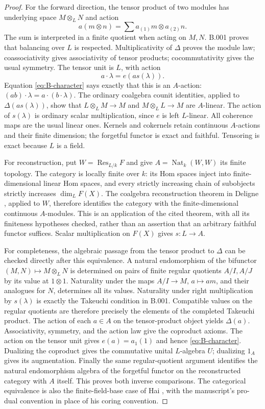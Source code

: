 \begin{proof}
For the forward direction, the tensor product of two modules has
underlying space $M\otimes_L N$ and action
\[
 a(m\otimes n)=\sum a_{(1)}m\otimes a_{(2)}n.
\]
The sum is interpreted in a finite quotient when acting on $M,N$.
B.001 proves that balancing over $L$ is respected. Multiplicativity
of $\Delta$ proves the module law; coassociativity gives associativity
of tensor products; cocommutativity gives the usual symmetry. The
tensor unit is $L$, with action
\[
 a\cdot\lambda=e(a s(\lambda)).
\]
Equation \eqref{eq:B-character} says exactly that this is an $A$-action:
$(ab)\cdot\lambda=a\cdot(b\cdot\lambda)$. The ordinary coalgebra
counit identities, applied to $\Delta(a s(\lambda))$, show that
$L\otimes_L M\longrightarrow M$ and $M\otimes_L L\longrightarrow M$
are $A$-linear. The action of $s(\lambda)$ is ordinary scalar
multiplication, since $e$ is left $L$-linear. All coherence maps are
the usual linear ones. Kernels and cokernels retain continuous
$A$-actions and their finite dimension; the forgetful functor is exact
and faithful. Tensoring is exact because $L$ is a field.

For reconstruction, put $W=\operatorname{Res}_{L/k}F$ and give
$A=\operatorname{Nat}_k(W,W)$ its finite topology. The category is
locally finite over $k$: its Hom spaces inject into finite-dimensional
linear Hom spaces, and every strictly increasing chain of subobjects
strictly increases $\dim_LF(X)$. The coalgebra reconstruction theorem
in Deligne \cite[6.1--6.2]{Deligne1990}, applied to $W$, therefore
identifies the category with the finite-dimensional continuous
$A$-modules. This is an application of the cited theorem, with all its
finiteness hypotheses checked, rather than an assertion that an
arbitrary faithful functor suffices. Scalar multiplication on $F(X)$
gives $s:L\longrightarrow A$.

For completeness, the algebraic passage from the tensor product to
$\Delta$ can be checked directly after this equivalence. A natural
endomorphism of the bifunctor $(M,N)\longmapsto M\otimes_L N$ is
determined on pairs of finite regular quotients $A/I,A/J$ by its value
at $1\otimes1$. Naturality under the maps $A/I\longrightarrow M$,
$a\longmapsto am$, and their analogues for $N$, determines all its
values. Naturality under right multiplication by $s(\lambda)$ is
exactly the Takeuchi condition in B.001. Compatible values on the
regular quotients are therefore precisely the elements of the
completed Takeuchi product. The action of each $a\in A$ on the
tensor-product object yields $\Delta(a)$. Associativity, symmetry,
and the action law give the coproduct axioms. The action on the tensor
unit gives $e(a)=a_1(1)$ and hence \eqref{eq:B-character}. Dualizing
the coproduct gives the commutative unital $L$-algebra $U$; dualizing
$1_A$ gives its augmentation. Finally the same regular-quotient
argument identifies the natural endomorphism algebra of the
forgetful functor on the reconstructed category with $A$ itself.
This proves both inverse comparisons. The categorical equivalence is
also the finite-field-base case of Hai
\cite[Theorem 2.1.2 and Corollary 2.2.5]{Hai2008}, with the manuscript's
pro-dual convention in place of his coring convention.
\end{proof}

